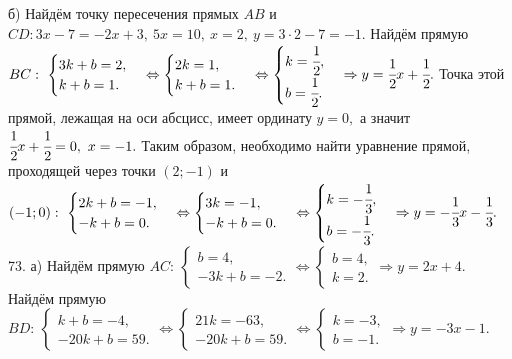 б) Найдём точку пересечения прямых $AB$ и $CD: 3x-7=-2x+3,\ 5x=10,\ x=2,\ y=3\cdot2-7=-1.$ Найдём прямую $BC:\ \begin{cases} 3k+b=2,\\ k+b=1.\end{cases}\Leftrightarrow\begin{cases} 2k=1,\\ k+b=1.\end{cases}\Leftrightarrow\begin{cases} k=\cfrac{1}{2},\\ b=\cfrac{1}{2}.\end{cases}\Rightarrow y=\cfrac{1}{2}x+\cfrac{1}{2}.$ Точка этой прямой, лежащая на оси абсцисс, имеет ординату $y=0,$ а значит $\cfrac{1}{2}x+\cfrac{1}{2}=0,\ x=-1.$ Таким образом, необходимо найти уравнение прямой, проходящей через точки $(2;-1)$ и $(-1;0): \ \begin{cases} 2k+b=-1,\\ -k+b=0.\end{cases}\Leftrightarrow\begin{cases} 3k=-1,\\ -k+b=0.\end{cases}\Leftrightarrow\begin{cases} k=-\cfrac{1}{3},\\ b=-\cfrac{1}{3}.\end{cases}\Rightarrow y=-\cfrac{1}{3}x-\cfrac{1}{3}.$\\
73. а) Найдём прямую $AC:\ \begin{cases} b=4,\\ -3k+b=-2.\end{cases}\Leftrightarrow\begin{cases} b=4,\\ k=2.\end{cases}\Rightarrow y=2x+4.$
Найдём прямую $BD:\ \begin{cases} k+b=-4,\\ -20k+b=59.\end{cases}\Leftrightarrow\begin{cases} 21k=-63,\\ -20k+b=59.\end{cases}
\Leftrightarrow\begin{cases} k=-3,\\ b=-1.\end{cases}\Rightarrow y=-3x-1.$\\
